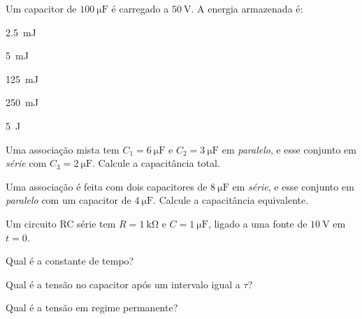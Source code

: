 \begin{questao}[1]{}

Um capacitor de $\SI{100}{\micro\farad}$ é carregado a $\SI{50}{\volt}$. A energia
armazenada é:
\begin{alternativas}[3]
\item \SI{2.5}{\milli\joule}
\item \SI{5}{\milli\joule}
\item \SI{125}{\milli\joule}
\item \SI{250}{\milli\joule}
\item \SI{5}{\joule}
\end{alternativas}


\end{questao}

\blocoaplicacao
\begin{questao}[2]{}

Uma associação mista tem $C_1 = \SI{6}{\micro\farad}$ e
$C_2 = \SI{3}{\micro\farad}$ em \emph{paralelo}, e esse conjunto em \emph{série}
com $C_3 = \SI{2}{\micro\farad}$. Calcule a capacitância total.




\end{questao}
\begin{questao}[2]{}

Uma associação é feita com dois capacitores de $\SI{8}{\micro\farad}$ em
\emph{série}, e esse conjunto em \emph{paralelo} com um capacitor de
$\SI{4}{\micro\farad}$. Calcule a capacitância equivalente.


\end{questao}
\begin{questao}[2]{}

Um circuito RC série tem $R = \SI{1}{\kilo\ohm}$ e $C = \SI{1}{\micro\farad}$,
ligado a uma fonte de $\SI{10}{\volt}$ em $t = 0$.
\begin{itensq}
\item Qual é a constante de tempo?
\item Qual é a tensão no capacitor após um intervalo igual a $\tau$?
\item Qual é a tensão em regime permanente?
\end{itensq}


\end{questao}
